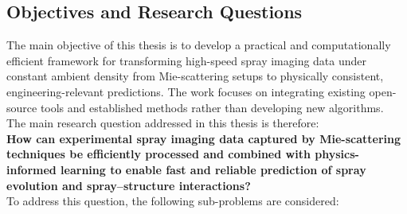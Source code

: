 \documentclass[english, 12pt, a4paper, elec, utf8, a-2b, online]{aaltothesis}
\begin{document}


\subsection{Objectives and Research Questions}





The main objective of this thesis is to develop a practical and computationally efficient framework for transforming high-speed spray imaging data under constant ambient density from Mie-scattering setups to physically consistent, engineering-relevant predictions. The work focuses on integrating existing open-source tools and established methods rather than developing new algorithms.\\

The main research question addressed in this thesis is therefore:\\

\textbf{How can experimental spray imaging data captured by Mie-scattering techniques be efficiently processed and combined with physics-informed learning to enable fast and reliable prediction of spray evolution and spray–structure interactions?}\\

To address this question, the following sub-problems are considered:
\end{document}
